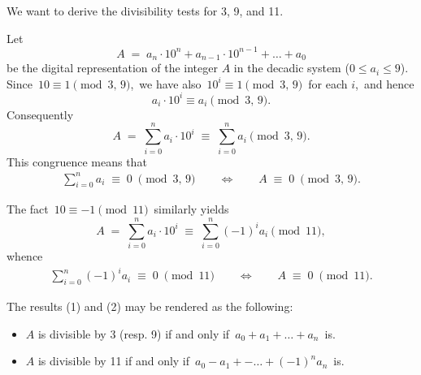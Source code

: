 \documentclass[12pt]{article}
\theoremstyle{definition}
\begin{document}
We want to derive the divisibility tests for 3, 9, and 11.

Let 
$$A \;=\; a_n\!\cdot\!10^n\!+\!a_{n-1}\!\cdot\!10^{n-1}\!+\ldots+\!a_0$$
be the digital representation of the integer $A$ in the decadic system ($0 \le a_i \le 9$).\\

Since\, $10 \equiv 1 \pmod {3,\,9}$,\, we have also\, $10^i \equiv 1 \pmod {3,\,9}$\, for each $i$,\, and hence
$$a_i\!\cdot\!10^i \equiv a_i \!\pmod {3,\,9}.$$
Consequently
$$A \;=\; \sum_{i=0}^na_i\!\cdot\!10^i \;\equiv\; \sum_{i=0}^na_i \!\pmod{3,\,9}.$$
This congruence means that
\begin{align}
\sum_{i=0}^na_i \;\equiv\; 0 \;\pmod{3,\,9} 
\qquad \Leftrightarrow \qquad A \;\equiv\; 0 \;\pmod{3,\,9}.
\end{align}

The fact\, $10 \equiv -1 \pmod {11}$\, similarly yields
$$A \;=\; \sum_{i=0}^na_i\!\cdot\!10^i \;\equiv\; \sum_{i=0}^n(-1)^ia_i \!\pmod{11},$$
whence
\begin{align}
\sum_{i=0}^n(-1)^ia_i \;\equiv\; 0 \;\pmod{11} 
\qquad \Leftrightarrow \qquad A \;\equiv\; 0 \;\pmod{11}.
\end{align}


The results (1) and (2) may be rendered as the following:

\begin{itemize}
\item $A$ is divisible by 3 (resp. 9) if and only if\, $a_0\!+\!a_1\!+\ldots+\!a_n$\, is.\\
\item $A$ is divisible by 11 if and only if\, $a_0\!-\!a_1\!+-\ldots+\!(-1)^na_n$\, is.
\end{itemize}
\end{document}
